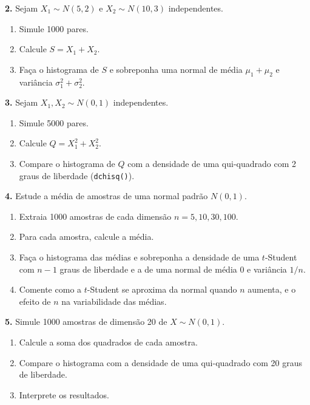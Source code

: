 \documentclass[
  portuguese,
  11pt,
  openany]{book}
\providecommand{\tightlist}{%
  \setlength{\itemsep}{0pt}\setlength{\parskip}{0pt}}
\begin{document}
\textbf{2.} Sejam \(X_1 \sim N(5, 2)\) e \(X_2 \sim N(10, 3)\) independentes.

\begin{enumerate}
\def\labelenumi{(\alph{enumi})}
\tightlist
\item
  Simule 1000 pares.
\item
  Calcule \(S = X_1 + X_2\).
\item
  Faça o histograma de \(S\) e sobreponha uma normal de média \(\mu_1 + \mu_2\) e variância
  \(\sigma_1^2 + \sigma_2^2\).
\end{enumerate}

\textbf{3.} Sejam \(X_1, X_2 \sim N(0, 1)\) independentes.

\begin{enumerate}
\def\labelenumi{(\alph{enumi})}
\tightlist
\item
  Simule 5000 pares.
\item
  Calcule \(Q = X_1^2 + X_2^2\).
\item
  Compare o histograma de \(Q\) com a densidade de uma qui-quadrado com 2 graus de
  liberdade (\texttt{dchisq()}).
\end{enumerate}

\textbf{4.} Estude a média de amostras de uma normal padrão \(N(0, 1)\).

\begin{enumerate}
\def\labelenumi{(\alph{enumi})}
\tightlist
\item
  Extraia 1000 amostras de cada dimensão \(n = 5, 10, 30, 100\).
\item
  Para cada amostra, calcule a média.
\item
  Faça o histograma das médias e sobreponha a densidade de uma \(t\)-Student com \(n - 1\)
  graus de liberdade e a de uma normal de média 0 e variância \(1/n\).
\item
  Comente como a \(t\)-Student se aproxima da normal quando \(n\) aumenta, e o efeito de
  \(n\) na variabilidade das médias.
\end{enumerate}

\textbf{5.} Simule 1000 amostras de dimensão 20 de \(X \sim N(0, 1)\).

\begin{enumerate}
\def\labelenumi{(\alph{enumi})}
\tightlist
\item
  Calcule a soma dos quadrados de cada amostra.
\item
  Compare o histograma com a densidade de uma qui-quadrado com 20 graus de liberdade.
\item
  Interprete os resultados.
\end{enumerate}
\end{document}
